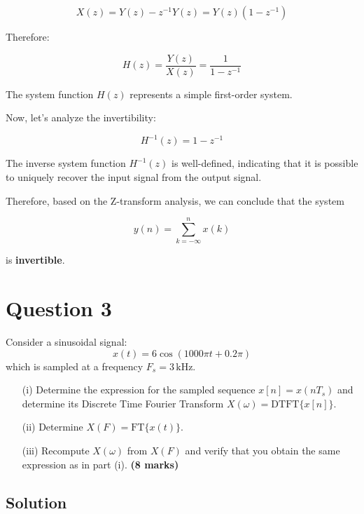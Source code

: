 \documentclass[12pt]{article}
\begin{document}
    \[
    X(z) = Y(z) - z^{-1} Y(z) = Y(z)(1 - z^{-1})
    \]
    
    \noindent Therefore:
    
    \[
    H(z) = \frac{Y(z)}{X(z)} = \frac{1}{1 - z^{-1}}
    \]
    
    \noindent The system function \( H(z) \) represents a simple first-order system.
    
    \bigskip
    
    \noindent Now, let's analyze the invertibility:
    
    \[
    H^{-1}(z) = 1 - z^{-1}
    \]
    
    \noindent The inverse system function \( H^{-1}(z) \) is well-defined, indicating that it is possible to uniquely recover the input signal from the output signal.
    
    \bigskip
    
    \noindent Therefore, based on the Z-transform analysis, we can conclude that the system
    
    \[
    y(n) = \sum_{k=-\infty}^{n} x(k)
    \]
    
    \noindent is \textbf{invertible}.
    
    
    
    
    
    
    \section*{Question 3}
    
    Consider a sinusoidal signal:  
    \[
    x(t) = 6 \cos(1000\pi t + 0.2\pi)
    \]  
    which is sampled at a frequency \( F_s = 3 \, \text{kHz} \).
    
    \begin{enumerate}
    	\item[(i)] Determine the expression for the sampled sequence \( x[n] = x(nT_s) \) and determine its Discrete Time Fourier Transform \( X(\omega) = \text{DTFT}\{x[n]\} \).
    	\item[(ii)] Determine \( X(F) = \text{FT}\{x(t)\} \).
    	\item[(iii)] Recompute \( X(\omega) \) from \( X(F) \) and verify that you obtain the same expression as in part (i). \textbf{(8 marks)}
    \end{enumerate}
    
    \subsection*{Solution}
    
\end{document}
